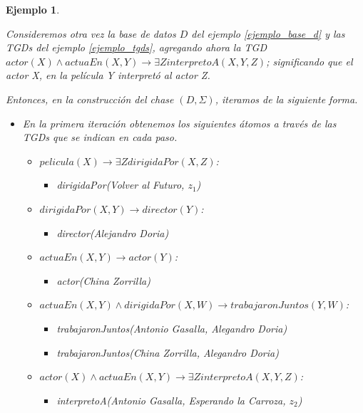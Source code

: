 \documentclass[11pt,a4paper,twoside]{tesis}
\newtheorem{exmp}{Ejemplo}
\begin{document}
\begin{exmp}\label{ejemplo_chase}

    Consideremos otra vez la base de datos $D$ del ejemplo \ref{ejemplo_base_d} y las TGDs del ejemplo \ref{ejemplo_tgds}, agregando ahora la TGD $actor(X) \land actuaEn(X, Y) \rightarrow \exists Z interpretoA(X, Y, Z)$; significando que el actor X, en la película Y interpretó al actor Z. 
    
    Entonces, en la construcción del chase $(D, \Sigma)$, iteramos de la siguiente forma.
    
    \begin{itemize}
        \item En la primera iteración obtenemos los siguientes átomos a través de las TGDs que se indican en cada paso.
        \begin{itemize}
            \item $pelicula(X) \rightarrow \exists Z dirigidaPor(X, Z)$:
            \begin{itemize}
                \item \textit{dirigidaPor(Volver al Futuro, $z_1$)}
            \end{itemize}
            \item $dirigidaPor(X, Y) \rightarrow director(Y)$:
            \begin{itemize}
                \item  \textit{director(Alejandro Doria)}
            \end{itemize}
            \item $actuaEn(X, Y) \rightarrow actor(Y)$:
            \begin{itemize}
                \item  \textit{actor(China Zorrilla)}
            \end{itemize}
            \item $actuaEn(X, Y) \land dirigidaPor(X, W) \rightarrow trabajaronJuntos(Y, W) $:
            \begin{itemize}
                \item  \textit{trabajaronJuntos(Antonio Gasalla, Alegandro Doria)}
                \item  \textit{trabajaronJuntos(China Zorrilla, Alegandro Doria)}
            \end{itemize}            
            \item $actor(X) \land actuaEn(X, Y) \rightarrow \exists Z interpretoA(X, Y, Z)$:
            \begin{itemize}
                \item  \textit{interpretoA(Antonio Gasalla, Esperando la Carroza, $z_2$)}
            \end{itemize}
        \end{itemize}


\end{itemize}
\end{exmp}
\end{document}
